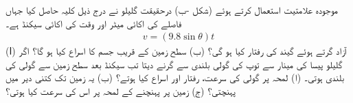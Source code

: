 موجودہ علامتیت استعمال کرتے ہوئے (شکل -ب)  درحقیقت گلیلو نے درج ذیل کلیہ حاصل کیا   جہاں فاصلے کی اکائی میٹر اور وقت کی اکائی سیکنڈ ہے۔
\begin{align*}
v=(9.8\sin \theta)t
\end{align*} 
(ا) آزاد گرتے ہوئے گیند کی رفتار کیا ہو گی؟ (ب) سطح زمین کے قریب جسم کا اسراع کیا ہو گا؟
اگر گلیلو  پیسا کی  مینار   سے توپ کی گولی  بلندی سے گرنے دیتا تب  سیکنڈ بعد سطح زمین سے  گولی  کی بلندی  ہوتی۔ (ا) لمحہ  پر گولی کی سرعت، رفتار اور اسراع کیا ہوتے؟ (ب) یہ زمین تک کتنی دیر میں پہنچتی؟ (ج) زمین پر پہنچنے کے لمحہ پر اس کی سرعت کیا ہوتی؟ 

